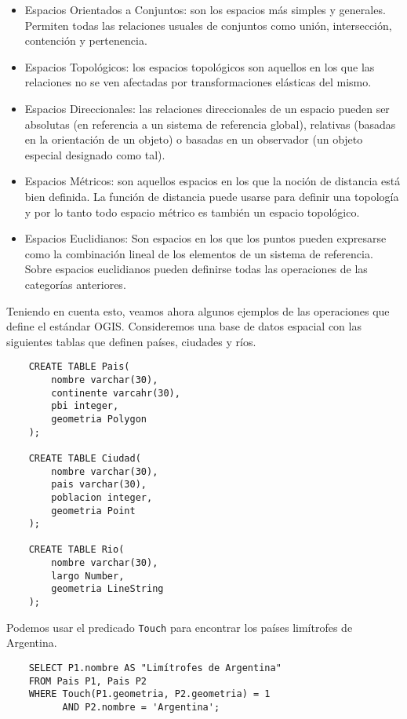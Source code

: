 \begin{itemize}
    \item Espacios Orientados a Conjuntos: son los espacios más simples y generales.
    Permiten todas las relaciones usuales de conjuntos como unión, intersección, contención y pertenencia.
    \item Espacios Topológicos: los espacios topológicos son aquellos en los que las relaciones no se ven afectadas
    por transformaciones elásticas del mismo.
    \item Espacios Direccionales: las relaciones direccionales de un espacio pueden ser
    absolutas (en referencia a un sistema de referencia global),
    relativas (basadas en la orientación de un objeto)
    o basadas en un observador (un objeto especial designado como tal).
    \item Espacios Métricos: son aquellos espacios en los que la noción de distancia está bien definida. La función de distancia puede usarse
    para definir una topología y por lo tanto todo espacio métrico es también un espacio topológico.
    \item Espacios Euclidianos: Son espacios en los que los puntos pueden expresarse como la combinación lineal de los elementos de
    un sistema de referencia. Sobre espacios euclidianos pueden definirse todas las operaciones de las categorías anteriores.
\end{itemize}

Teniendo en cuenta esto, veamos ahora algunos ejemplos de las operaciones que define el estándar OGIS.
Consideremos una base de datos espacial con las siguientes tablas que definen países, ciudades y ríos.

\begin{verbatim}
    CREATE TABLE Pais(
        nombre varchar(30),
        continente varcahr(30),
        pbi integer,
        geometria Polygon
    );

    CREATE TABLE Ciudad(
        nombre varchar(30),
        pais varchar(30),
        poblacion integer,
        geometria Point
    );

    CREATE TABLE Rio(
        nombre varchar(30),
        largo Number,
        geometria LineString
    );
\end{verbatim}

Podemos usar el predicado \texttt{Touch} para encontrar los países limítrofes de Argentina.

\begin{verbatim}
    SELECT P1.nombre AS "Limítrofes de Argentina"
    FROM Pais P1, Pais P2
    WHERE Touch(P1.geometria, P2.geometria) = 1
          AND P2.nombre = 'Argentina';
\end{verbatim}

